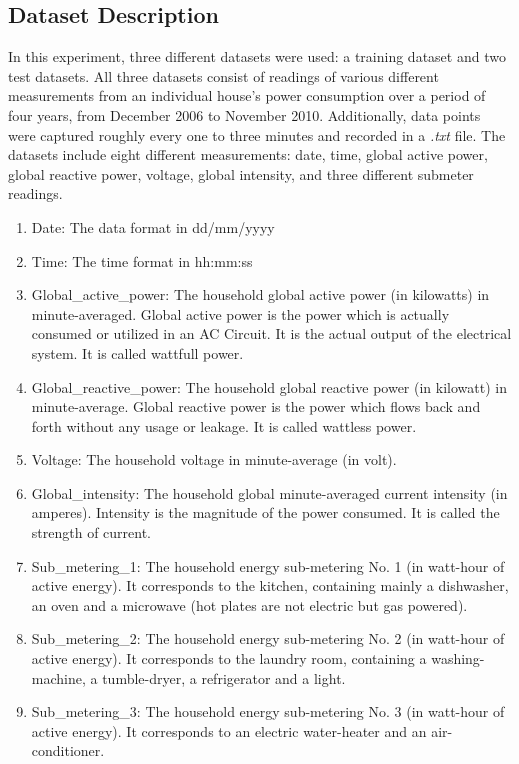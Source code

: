 \documentclass[letterpaper, 11pt]{article}%
\begin{document}
\subsection{Dataset Description}
In this experiment, three different datasets were used: a training dataset and two test datasets. All three datasets consist of readings of various different measurements from an individual house's power consumption over a period of four years, from December 2006 to November 2010. Additionally, data points were captured roughly every one to three minutes and recorded in a \textit{.txt} file. The datasets include eight different measurements: date, time, global active power, global reactive power, voltage, global intensity, and three different submeter readings. 
\begin{enumerate}
  \item
    Date: The data format in dd/mm/yyyy
  \item
    Time: The time format in hh:mm:ss
  \item
    Global\_active\_power: The household global active power (in kilowatts) in minute-averaged. Global active power is the power which is actually consumed or utilized in an AC Circuit. It is the actual output of the electrical system. It is called wattfull power\cite{dataset}.
  \item
    Global\_reactive\_power: The household global reactive power (in kilowatt) in minute-average. Global reactive power is the power which flows back and forth without any usage or leakage. It is called wattless power.
  \item
    Voltage: The household voltage in minute-average (in volt).
  \item
    Global\_intensity: The household global minute-averaged current intensity (in amperes). Intensity is the magnitude of the power consumed. It is called the strength of current.  
  \item
    Sub\_metering\_1: The household energy sub-metering No. 1 (in watt-hour of active energy). It corresponds to the kitchen, containing mainly a dishwasher, an oven and a microwave (hot plates are not electric but gas powered).
  \item
    Sub\_metering\_2: The household energy sub-metering No. 2 (in watt-hour of active energy). It corresponds to the laundry room, containing a washing-machine, a tumble-dryer, a refrigerator and a light.
  \item
    Sub\_metering\_3: The household energy sub-metering No. 3 (in watt-hour of active energy). It corresponds to an electric water-heater and an air-conditioner.
\end{enumerate}    
\end{document}
